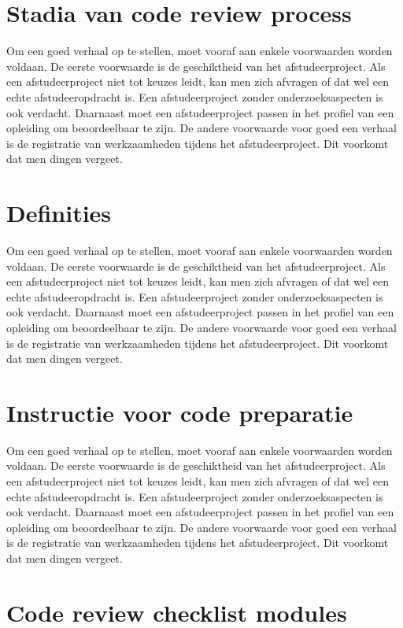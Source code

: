 			\section{Stadia van code review process}
			
			Om een goed verhaal op te stellen, moet vooraf aan enkele voorwaarden
			worden voldaan. De eerste voorwaarde is de geschiktheid van het
			afstudeerproject. Als een afstudeerproject niet tot keuzes leidt, kan
			men zich afvragen of dat wel een echte afstudeeropdracht is. Een
			afstudeerproject zonder onderzoeksaspecten is ook verdacht. Daarnaast
			moet een afstudeerproject passen in het profiel van een opleiding om
			beoordeelbaar te zijn. De andere voorwaarde voor goed een verhaal is
			de registratie van werkzaamheden tijdens het afstudeerproject. Dit
			voorkomt dat men dingen vergeet.
			\section{Definities}
			
			Om een goed verhaal op te stellen, moet vooraf aan enkele voorwaarden
			worden voldaan. De eerste voorwaarde is de geschiktheid van het
			afstudeerproject. Als een afstudeerproject niet tot keuzes leidt, kan
			men zich afvragen of dat wel een echte afstudeeropdracht is. Een
			afstudeerproject zonder onderzoeksaspecten is ook verdacht. Daarnaast
			moet een afstudeerproject passen in het profiel van een opleiding om
			beoordeelbaar te zijn. De andere voorwaarde voor goed een verhaal is
			de registratie van werkzaamheden tijdens het afstudeerproject. Dit
			voorkomt dat men dingen vergeet.
			\section{Instructie voor code preparatie}
			
			Om een goed verhaal op te stellen, moet vooraf aan enkele voorwaarden
			worden voldaan. De eerste voorwaarde is de geschiktheid van het
			afstudeerproject. Als een afstudeerproject niet tot keuzes leidt, kan
			men zich afvragen of dat wel een echte afstudeeropdracht is. Een
			afstudeerproject zonder onderzoeksaspecten is ook verdacht. Daarnaast
			moet een afstudeerproject passen in het profiel van een opleiding om
			beoordeelbaar te zijn. De andere voorwaarde voor goed een verhaal is
			de registratie van werkzaamheden tijdens het afstudeerproject. Dit
			voorkomt dat men dingen vergeet.
			\section{Code review checklist modules
			}
			
